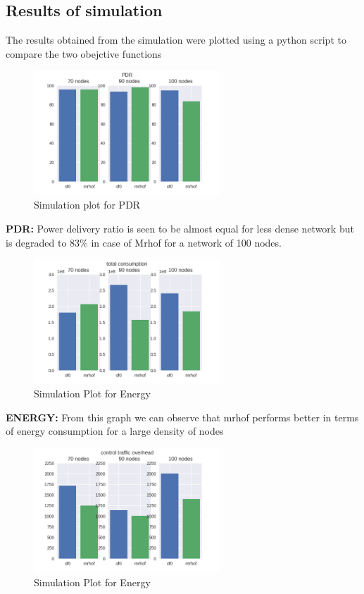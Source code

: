 \subsection{Results of simulation} \label{Results of simulation}
The results obtained from the simulation were plotted using a python script to compare the two obejctive functions\\
\begin{figure}[H]
\centering
\includegraphics[width=70mm]{PDR.png}
\caption{Simulation plot for PDR}
\end{figure}
\textbf{PDR: }Power delivery ratio is seen to be almost equal for less dense network but is degraded to 83\% in case of Mrhof for a network of 100 nodes.\\
\begin{figure}[H]
\centering
\includegraphics[width=70mm]{total consumption.png}
\caption{Simulation Plot for Energy}
\end{figure}
\textbf{ENERGY: }From this graph we can observe that mrhof performs better in terms of energy consumption for a large density of nodes
\begin{figure}[H]
\centering
\includegraphics[width=70mm]{control traffic overhead.png}
\caption{Simulation Plot for Energy}
\end{figure}
